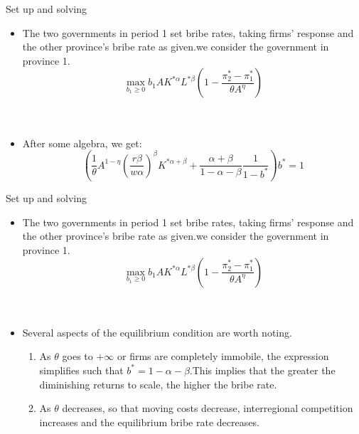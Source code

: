 \documentclass{beamer}
\begin{document}
\begin{frame}{Set up and solving}

\begin{itemize}
\item The two governments in period 1 set bribe rates, taking firms' response and the other province's bribe rate as given.we consider the government in province 1.
\begin{equation*}
\underset{b_1\geqslant 0}{\max}b_1AK^{*\alpha}L^{*\beta}\left( 1-\frac{\pi _{2}^{*}-\pi _{1}^{*}}{\theta A^{\eta}} \right) 
\end{equation*}     \\~

\item After some algebra, we get:
\begin{equation}
\left( \frac{1}{\theta}A^{1-\eta}\left( \frac{r\beta}{w\alpha} \right) ^{\beta}K^{*\alpha +\beta}+\frac{\alpha +\beta}{1-\alpha -\beta}\frac{1}{1-b^*} \right) b^*=1
\end{equation}

\end{itemize}

\end{frame}

\begin{frame}{Set up and solving}

\begin{itemize}
\item The two governments in period 1 set bribe rates, taking firms' response and the other province's bribe rate as given.we consider the government in province 1.
\begin{equation*}
\underset{b_1\geqslant 0}{\max}b_1AK^{*\alpha}L^{*\beta}\left( 1-\frac{\pi _{2}^{*}-\pi _{1}^{*}}{\theta A^{\eta}} \right) 
\end{equation*}     \\~

\item Several aspects of the equilibrium condition are worth noting.
\begin{enumerate}
\item As $\theta $ goes to $+\infty $ or firms are completely immobile, the expression simplifies such that $b^*=1-\alpha -\beta$.This implies that the greater the diminishing returns to scale, the higher the bribe rate.
\item As $\theta$ decreases, so that moving costs decrease, interregional competition increases and the equilibrium bribe rate decreases.

\end{enumerate}

\end{itemize}

\end{frame}
\end{document}
